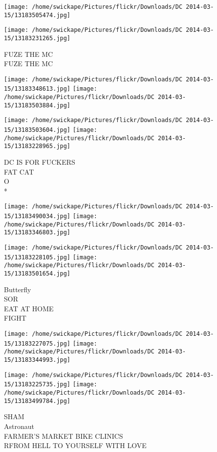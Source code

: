 \documentclass[10pt,letterpaper]{article}
\begin{document}
\texttt{[image: /home/swickape/Pictures/flickr/Downloads/DC 2014-03-15/13183505474.jpg]}

\vspace{0.25in}
\texttt{[image: /home/swickape/Pictures/flickr/Downloads/DC 2014-03-15/13183231265.jpg]}

FUZE THE MC\\
FUZE THE MC
\pagebreak

\texttt{[image: /home/swickape/Pictures/flickr/Downloads/DC 2014-03-15/13183348613.jpg]}
\texttt{[image: /home/swickape/Pictures/flickr/Downloads/DC 2014-03-15/13183503884.jpg]}

\texttt{[image: /home/swickape/Pictures/flickr/Downloads/DC 2014-03-15/13183503604.jpg]}
\texttt{[image: /home/swickape/Pictures/flickr/Downloads/DC 2014-03-15/13183228965.jpg]}

DC IS FOR FUCKERS\\
FAT CAT\\
O\\
*
\pagebreak

\texttt{[image: /home/swickape/Pictures/flickr/Downloads/DC 2014-03-15/13183490034.jpg]}
\texttt{[image: /home/swickape/Pictures/flickr/Downloads/DC 2014-03-15/13183346803.jpg]}

\texttt{[image: /home/swickape/Pictures/flickr/Downloads/DC 2014-03-15/13183228105.jpg]}
\texttt{[image: /home/swickape/Pictures/flickr/Downloads/DC 2014-03-15/13183501654.jpg]}

Butterfly\\
SOR\\
EAT AT HOME\\
FIGHT
\pagebreak

\texttt{[image: /home/swickape/Pictures/flickr/Downloads/DC 2014-03-15/13183227075.jpg]}
\texttt{[image: /home/swickape/Pictures/flickr/Downloads/DC 2014-03-15/13183344993.jpg]}

\texttt{[image: /home/swickape/Pictures/flickr/Downloads/DC 2014-03-15/13183225735.jpg]}
\texttt{[image: /home/swickape/Pictures/flickr/Downloads/DC 2014-03-15/13183499784.jpg]}

SHAM\\
Astronaut\\
FARMER'S MARKET BIKE CLINICS\\
RFROM HELL TO YOURSELF WITH LOVE
\pagebreak
\end{document}
